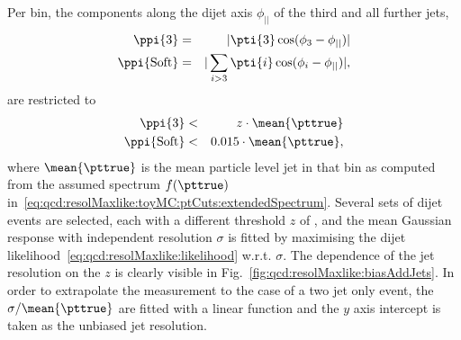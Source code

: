 Per bin, the \pt components along the dijet axis $\phi_{||}$ of the third and all further jets,
\begin{eqnarray*}
  \ppi{3} & = & |\pti{3}\cos(\phi_{3}-\phi_{||})| \\
  \ppi{\text{Soft}} & = & |\sum_{i>3}\pti{i}\cos(\phi_{i}-\phi_{||})|,
\end{eqnarray*}
are restricted to
\begin{eqnarray*}
  \ppi{3} & < & z\cdot\mean{\pttrue} \\
  \ppi{\text{Soft}} & < & 0.015\cdot\mean{\pttrue},
\end{eqnarray*}
where $\mean{\pttrue}$ is the mean particle level jet \pt in that bin
as computed from the assumed spectrum $f(\pttrue)$
in~\eqref{eq:qcd:resolMaxlike:toyMC:ptCuts:extendedSpectrum}.
Several sets of dijet events are selected, each with a different
threshold $z$ of , and the mean Gaussian response with \pt
independent resolution $\sigma$ is fitted by maximising the dijet
likelihood~\eqref{eq:qcd:resolMaxlike:likelihood} w.r.t. $\sigma$.
The dependence of the jet \pt resolution on the $z$ is clearly visible in Fig.~\ref{fig:qcd:resolMaxlike:biasAddJets}.
In order to extrapolate the measurement to the case of a two jet only
event, the \mbox{$\sigma/\mean{\pttrue}$} are fitted with a linear
function and the $y$ axis intercept is taken as the unbiased jet \pt
resolution.

